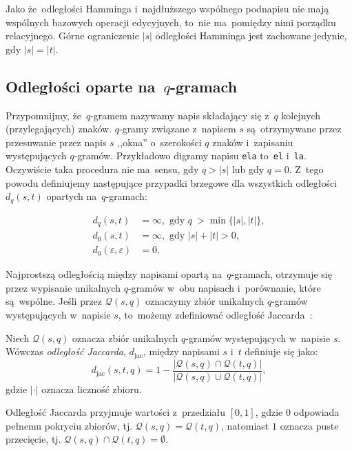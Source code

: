\documentclass{praca1}
\begin{document}
Jako że~odległości Hamminga i~najdłuższego wspólnego podnapisu nie mają wspólnych bazowych operacji edycyjnych, to~nie ma~pomiędzy nimi porządku relacyjnego. Górne ograniczenie $|s|$ odległości Hamminga jest zachowane jedynie, gdy $|s| = |t|$.







\subsection{Odległości oparte na~$q$-gramach}

Przypomnijmy, że~$q$-gramem nazywamy napis składający się z~$q$ kolejnych (przylegających) znaków. $q$-gramy związane z~napisem $s$ są~otrzymywane przez przesuwanie przez napis $s$ ,,okna'' o~szerokości $q$ znaków i~zapisaniu występujących $q$-gramów. Przykładowo digramy napisu \verb|ela| to~\verb|el| i~\verb|la|. Oczywiście taka procedura nie ma~sensu, gdy $q > |s|$ lub gdy $q = 0$. Z~tego powodu definiujemy następujące przypadki brzegowe dla wszystkich odległości $d_q(s,t)$ opartych na~$q$-gramach:

\begin{align*}
d_q(s,t) &= \infty, \text{ gdy } q~> \min\{|s|, |t|\},\\
d_0(s,t) &= \infty, \text{ gdy } |s| + |t| > 0, \\
d_0(\varepsilon,\varepsilon) &= 0.
\end{align*}

Najprostszą odległością między napisami opartą na~$q$-gramach, otrzymuje się przez wypisanie unikalnych $q$-gramów w~obu napisach i~porównanie, które są~wspólne. Jeśli przez $\mathcal{Q}(s,q)$ oznaczymy zbiór unikalnych $q$-gramów występujących w~napisie $s$, to~możemy zdefiniować odległość Jaccarda~\cite{Loo2014:stringdist}:

\begin{definition}
Niech $\mathcal{Q}(s,q)$ oznacza zbiór unikalnych $q$-gramów występujących w~napisie $s$. Wówczas \emph{odległość Jaccarda}, $d_{\mathrm{jac}}$, między napisami $s$ i~$t$ definiuje się jako:
\begin{equation*}
d_{\mathrm{jac}}(s,t,q) = 1 - \frac{|\mathcal{Q}(s,q) \cap \mathcal{Q}(t,q)|}{|\mathcal{Q}(s,q) \cup \mathcal{Q}(t,q)|},
\end{equation*}
gdzie $|\cdot|$ oznacza liczność zbioru.
\end{definition} 

Odległość Jaccarda przyjmuje wartości z~przedziału $[0,1]$, gdzie $0$ odpowiada pełnemu pokryciu zbiorów, tj. $\mathcal{Q}(s,q) = \mathcal{Q}(t,q)$, natomiast $1$ oznacza puste przecięcie, tj. \hbox{$\mathcal{Q}(s,q) \cap \mathcal{Q}(t,q) = \emptyset$.}
\end{document}

